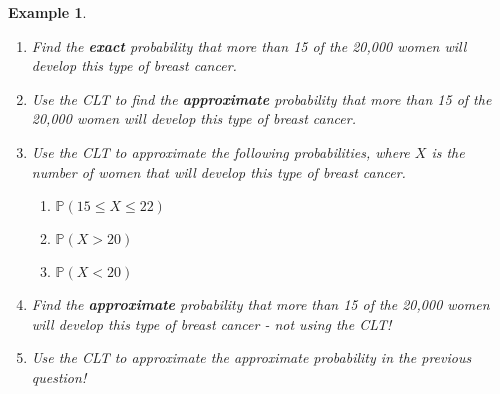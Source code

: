 \documentclass[12pt]{amsart}
\newtheorem{example}[theorem]{Example}
\newcommand\Pbb{\mathbb{P}}
\begin{document}
{\begin{example}
\begin{enumerate}
\vspace{3cm}

\item Find the \textbf{exact} probability that more than 15 of the 20,000 women will develop this type of breast cancer.

\vspace{8cm}

\item Use the CLT to find the \textbf{approximate} probability that more than 15 of the 20,000 women will develop this type of breast cancer.

\vspace{5cm}

\newpage

\item Use the CLT to approximate the following probabilities, where $X$ is the number of women that will develop this type of breast cancer.
	\begin{enumerate}
	\item $\Pbb(15 \leq X \leq 22)$
	\item $\Pbb(X > 20)$
	\item $\Pbb(X < 20)$
	\end{enumerate}

\vspace{8cm}


\item Find the \textbf{approximate} probability that more than 15 of the 20,000 women will develop this type of breast cancer - not using the CLT!

\vspace{7cm}

\item Use the CLT to approximate the approximate probability in the previous question!

\vspace{5cm}

\end{enumerate}
\end{example}



}  %
\end{document}
